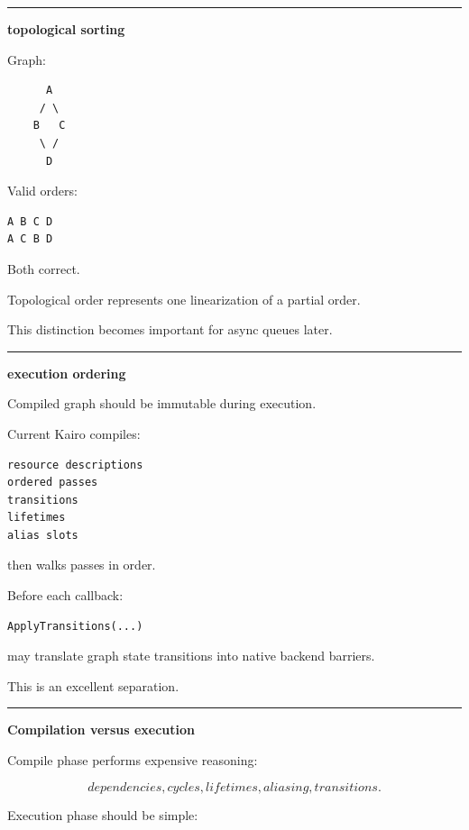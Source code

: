 \begin{center}\rule{0.5\linewidth}{0.5pt}\end{center}

\textbf{topological sorting}

Graph:

\begin{verbatim}
      A
     / \
    B   C
     \ /
      D
\end{verbatim}

Valid orders:

\begin{verbatim}
A B C D
A C B D
\end{verbatim}

Both correct.

Topological order represents one linearization of a partial order.

This distinction becomes important for async queues later.

\begin{center}\rule{0.5\linewidth}{0.5pt}\end{center}

\textbf{execution ordering}

Compiled graph should be immutable during execution.

Current Kairo compiles:

\begin{verbatim}
resource descriptions
ordered passes
transitions
lifetimes
alias slots
\end{verbatim}

then  walks passes in order.

Before each callback:

\begin{verbatim}
ApplyTransitions(...)
\end{verbatim}

may translate graph state transitions into native backend barriers.

This is an excellent separation.

\begin{center}\rule{0.5\linewidth}{0.5pt}\end{center}

\textbf{Compilation versus execution}

Compile phase performs expensive reasoning:

\[
dependencies,
cycles,
lifetimes,
aliasing,
transitions.
\]

Execution phase should be simple:

